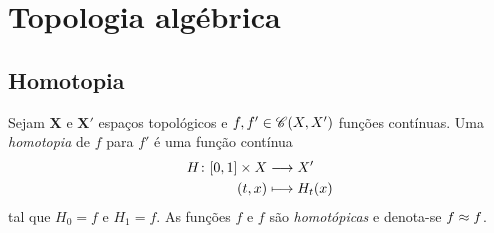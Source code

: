 \section{Topologia algébrica}

\subsection{Homotopia}

\begin{definition}
Sejam $\bm X$ e $\bm X'$ espaços topológicos e $f,f' \in \mathscr{C}(X,X')$ funções contínuas. Uma \textit{homotopia} de $f$ para $f'$ é uma função contínua
	\begin{align*}
	{H}\colon {\left[{0},{1}\right] \times X} &\longrightarrow {X'} \\{(t,x)} &\longmapsto H_t(x)
	\end{align*}
tal que $H_0 = f$ e $H_1 = f$. As funções $f$ e $f$ são \textit{homotópicas} e denota-se $f \approx f$.
\end{definition}

